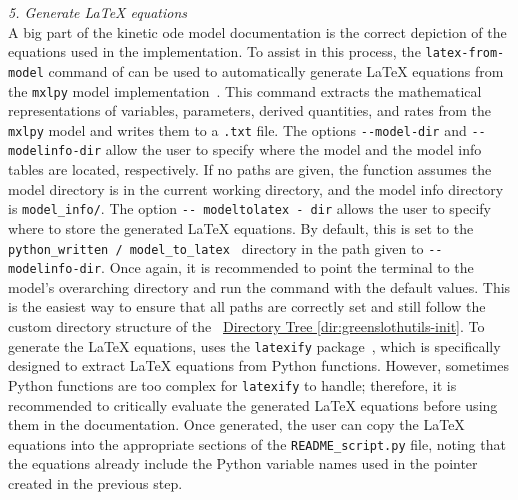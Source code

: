 \emph{5. Generate \LaTeX{} equations}\\
A big part of the kinetic \gls{ode} model documentation is the correct depiction of the equations used in the implementation. To assist in this process, the \verb|latex-from-model| command of \greensloth[GreenSlothUtils] can be used to automatically generate \LaTeX{} equations from the \verb|mxlpy| model implementation~. This command extracts the mathematical representations of variables, parameters, derived quantities, and rates from the \verb|mxlpy| model and writes them to a \verb|.txt| file. The options \verb|--model-dir| and \verb|--modelinfo-dir| allow the user to specify where the model and the model info tables are located, respectively. If no paths are given, the function assumes the model directory is in the current working directory, and the model info directory is \verb|model_info/|. The option \verb|-- modeltolatex - dir| allows the user to specify where to store the generated \LaTeX{} equations. By default, this is set to the \verb| python_written / model_to_latex | directory in the path given to \verb|--modelinfo-dir|. Once again, it is recommended to point the terminal to the model's overarching directory and run the command with the default values. This is the easiest way to ensure that all paths are correctly set and still follow the custom directory structure of the \greensloth{}~\hyperref[dir:greenslothutils-init]{Directory Tree \ref*{dir:greenslothutils-init}}. To generate the \LaTeX{} equations, \greensloth[GreenSlothUtils] uses the \verb|latexify| package~\cite{LatexifypyGeneratesLaTeX}, which is specifically designed to extract \LaTeX{} equations from Python functions. However, sometimes Python functions are too complex for \verb|latexify| to handle; therefore, it is recommended to critically evaluate the generated \LaTeX{} equations before using them in the documentation. Once generated, the user can copy the \LaTeX{} equations into the appropriate sections of the \verb|README_script.py| file, noting that the equations already include the Python variable names used in the pointer created in the previous step.

